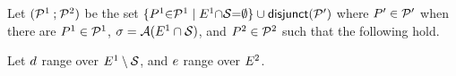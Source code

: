 \begin{definition}

  Let $(\mathcal{P}^1 \mathbin; \mathcal{P}^2)$ be the set
  $\{P^1{\in}\mathcal{P}^1\mid E^1{\cap}\mathcal{S}{=}\emptyset\}\cup \mathsf{disjunct}(\mathcal{P}')$
  where $P'\in\mathcal{P}'$ when there are $P^1 \in \mathcal{P}^1$,
  $\sigma=\mathcal{A}(E^1\cap\mathcal{S})$, 
  and $P^2\in\mathcal{P}^2$
  such that the following hold.

  Let $d$ range over $E^1\setminus\mathcal{S}$, and $e$ range over $E^2$.  


\end{definition}
